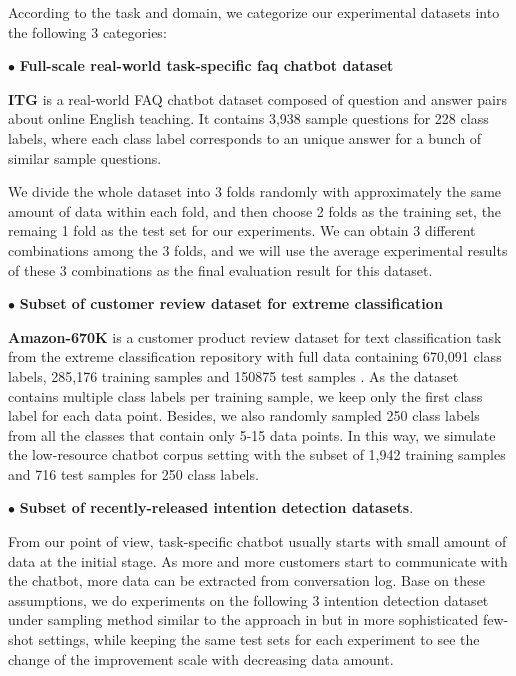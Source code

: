 \documentclass[letterpaper]{article} %
\begin{document}
  According to the task and domain, we categorize our experimental datasets into
  the following 3 categories:

  $\bullet$ \textbf{Full-scale real-world task-specific faq chatbot dataset}

  \textbf{ITG}  is  a  real-world  FAQ  chatbot dataset composed of question and
  answer pairs about online English teaching. It contains 3,938 sample questions
  for  228  class labels, where each class label corresponds to an unique answer
  for a bunch of similar sample questions.

  We  divide the whole dataset into 3 folds randomly with approximately the same
  amount  of data within each fold, and then choose 2 folds as the training set,
  the  remaing  1  fold  as  the  test  set for our experiments. We can obtain 3
  different  combinations  among  the  3  folds,  and  we  will  use the average
  experimental  results  of  these 3 combinations as the final evaluation result
  for this dataset.

  $\bullet$ \textbf{Subset of customer review dataset for extreme classification}

  \textbf{Amazon-670K}   is   a   customer   product  review  dataset  for  text
  classification  task from the extreme classification repository with full data
  containing  670,091  class  labels,  285,176  training samples and 150875 test
  samples \cite{bhatia2016extreme}.  As  the  dataset  contains  multiple class
  labels  per  training sample, we keep only the first class label for each data
  point. Besides, we also randomly sampled 250 class labels from all the classes
  that  contain only 5-15 data points. In this way, we simulate the low-resource
  chatbot  corpus setting with the subset of 1,942 training samples and 716 test
  samples for 250 class labels.

  $\bullet$ \textbf{Subset of recently-released intention detection datasets}.

  From our point of view, task-specific chatbot usually starts with small amount
  of  data at the initial stage. As more and more customers start to communicate
  with  the  chatbot,  more data can be extracted from conversation log. Base on
  these  assumptions,  we  do  experiments  on  the following 3 intention detection
  dataset    under    sampling    method    similar    to    the   approach   in
  \cite{casanueva2020efficient}  but  in  more  sophisticated few-shot settings,
  while  keeping the same test sets for each experiment to see the change of the
  improvement scale with decreasing data amount.
  
\end{document}
